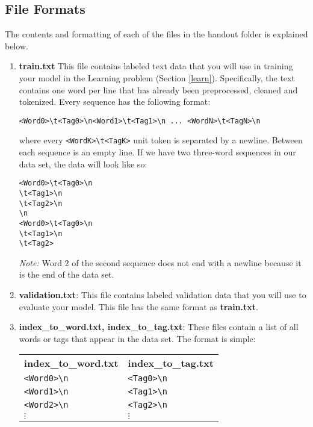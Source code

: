 \documentclass[11pt,addpoints,answers]{exam}
\begin{document}
\clearpage

\subsection{File Formats}\label{formats}
The contents and formatting of each of the files in the handout folder is explained below. 
\begin{enumerate}

\item \textbf{train.txt} This file contains labeled text data that you will use in training your model in the Learning problem (Section \ref{learn}). Specifically, the text contains one word per line that has already been preprocessed, cleaned and tokenized. Every sequence has the following format:

    \texttt{<Word0>\textbackslash t<Tag0>\textbackslash n<Word1>\textbackslash t<Tag1>\textbackslash n ... <WordN>\textbackslash t<TagN>\textbackslash n}

where every \texttt{<WordK>\textbackslash t<TagK>} unit token is separated by a newline. Between each sequence is an empty line. If we have two three-word sequences in our data set, the data will look like so:

    \texttt{<Word0>\textbackslash t<Tag0>\textbackslash n\\<Word1>\textbackslash t<Tag1>\textbackslash n\\<Word2>\textbackslash t<Tag2>\textbackslash n\\\textbackslash n\\}
    \texttt{<Word0>\textbackslash t<Tag0>\textbackslash n\\<Word1>\textbackslash t<Tag1>\textbackslash n\\<Word2>\textbackslash t<Tag2>}
    
\textit{Note:} Word 2 of the second sequence does not end with a newline because it is the end of the data set.

\item \textbf{validation.txt}: This file contains labeled validation data that you will use to evaluate your model. This file has the same format as \textbf{train.txt}.
    
\item \textbf{index\_to\_word.txt, index\_to\_tag.txt}: These files contain a list of all words or tags that appear in the data set. The format is simple:

\begin{tabular}{ m{5cm}  m{5cm} } 
    \textbf{index\_to\_word.txt} & \textbf{index\_to\_tag.txt} \\
    \texttt{<Word0>\textbackslash n} & \texttt{<Tag0>\textbackslash n} \\
    \texttt{<Word1>\textbackslash n} & \texttt{<Tag1>\textbackslash n} \\
    \texttt{<Word2>\textbackslash n} & \texttt{<Tag2>\textbackslash n} \\
    $\vdots$ & $\vdots$
\end{tabular}


\end{enumerate}
\end{document}
